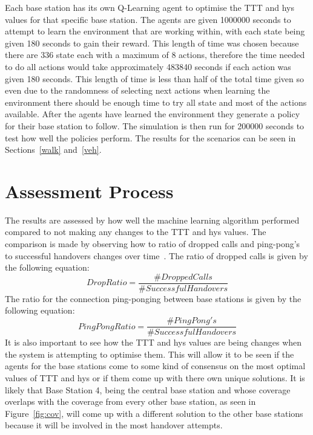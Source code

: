 Each base station has its own Q-Learning agent to optimise the TTT and hys values for that specific base station. The agents are given 1000000 seconds to attempt to learn the environment that are working within, with each state being given 180 seconds to gain their reward. This length of time was chosen because there are 336 state each with a maximum of 8 actions, therefore the time needed to do all actions would take approximately 483840 seconds if each action was given 180 seconds. This length of time is less than half of the total time given so even due to the randomness of selecting next actions when learning the environment there should be enough time to try all state and most of the actions available. After the agents have learned the environment they generate a policy for their base station to follow. The simulation is then run for 200000 seconds to test how well the policies perform. The results for the scenarios can be seen in Sections~\ref{walk} and~\ref{veh}.
\section{Assessment Process}\label{results}
The results are assessed by how well the machine learning algorithm performed compared to not making any changes to the TTT and hys values. The comparison is made by observing how to ratio of dropped calls and ping-pong's to successful handovers changes over time~\cite{sinclair2013advanced}. The ratio of dropped calls is given by the following equation:
\begin{equation}\label{eq:drop}
Drop Ratio = \frac{\#Dropped Calls}{\#Successful Handovers}
\end{equation}
The ratio for the connection ping-ponging between base stations is given by the following equation:
\begin{equation}\label{eq:ping}
PingPong Ratio = \frac{\#PingPong's}{\#Successful Handovers}
\end{equation}
It is also important to see how the TTT and hys values are being changes when the system is attempting to optimise them. This will allow it to be seen if the agents for the base stations come to some kind of consensus on the most optimal values of TTT and hys or if them come up with there own unique solutions. It is likely that Base Station 4, being the central base station and whose coverage overlaps with the coverage from every other base station, as seen in Figure~\ref{fig:cov}, will come up with a different solution to the other base stations because it will be involved in the most handover attempts.

